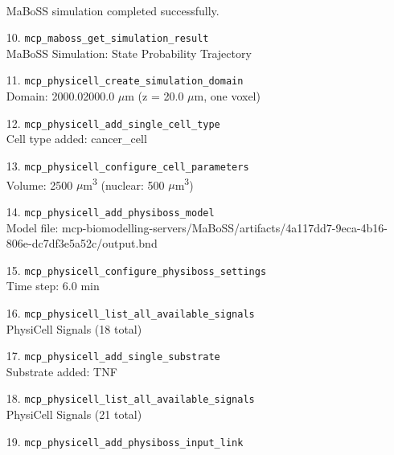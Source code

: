 \begin{enumerate}
\hfill\\
\RaggedRight MaBoSS simulation completed successfully.
\item[10.] \texttt{mcp\_\allowbreak{}maboss\_\allowbreak{}get\_\allowbreak{}simulation\_\allowbreak{}result}
\hfill\\
\RaggedRight MaBoSS Simulation: State Probability Trajectory
\item[11.] \texttt{mcp\_\allowbreak{}physicell\_\allowbreak{}create\_\allowbreak{}simulation\_\allowbreak{}domain}
\hfill\\
\RaggedRight Domain: 2000.0\times{}2000.0 \ensuremath{\mu}m (z = 20.0 \ensuremath{\mu}m, one voxel)
\item[12.] \texttt{mcp\_\allowbreak{}physicell\_\allowbreak{}add\_\allowbreak{}single\_\allowbreak{}cell\_\allowbreak{}type}
\hfill\\
\RaggedRight Cell type added: cancer\_cell
\item[13.] \texttt{mcp\_\allowbreak{}physicell\_\allowbreak{}configure\_\allowbreak{}cell\_\allowbreak{}parameters}
\hfill\\
\RaggedRight Volume: 2500 \ensuremath{\mu}m\textsuperscript{3} (nuclear: 500 \ensuremath{\mu}m\textsuperscript{3})
\item[14.] \texttt{mcp\_\allowbreak{}physicell\_\allowbreak{}add\_\allowbreak{}physiboss\_\allowbreak{}model}
\hfill\\
\RaggedRight Model file: mcp-biomodelling-servers/MaBoSS/artifacts/4a117dd7-9eca-4b16-806e-dc7df3e5a52c/output.bnd
\item[15.] \texttt{mcp\_\allowbreak{}physicell\_\allowbreak{}configure\_\allowbreak{}physiboss\_\allowbreak{}settings}
\hfill\\
\RaggedRight Time step: 6.0 min
\item[16.] \texttt{mcp\_\allowbreak{}physicell\_\allowbreak{}list\_\allowbreak{}all\_\allowbreak{}available\_\allowbreak{}signals}
\hfill\\
\RaggedRight PhysiCell Signals (18 total)
\item[17.] \texttt{mcp\_\allowbreak{}physicell\_\allowbreak{}add\_\allowbreak{}single\_\allowbreak{}substrate}
\hfill\\
\RaggedRight Substrate added: TNF
\item[18.] \texttt{mcp\_\allowbreak{}physicell\_\allowbreak{}list\_\allowbreak{}all\_\allowbreak{}available\_\allowbreak{}signals}
\hfill\\
\RaggedRight PhysiCell Signals (21 total)
\item[19.] \texttt{mcp\_\allowbreak{}physicell\_\allowbreak{}add\_\allowbreak{}physiboss\_\allowbreak{}input\_\allowbreak{}link}

\end{enumerate}

